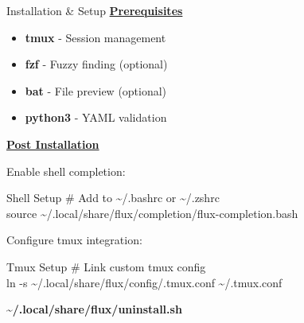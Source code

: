 \documentclass[10pt,a4paper]{article}
\begin{document}
\begin{multicols}{3}
\begin{textbox}{Installation \& Setup}
\underline{\textbf{Prerequisites}}
\begin{itemize}
    \item \textbf{tmux} - Session management
    \item \textbf{fzf} - Fuzzy finding (optional)
    \item \textbf{bat} - File preview (optional)  
    \item \textbf{python3} - YAML validation
\end{itemize}

\underline{\textbf{Post Installation}}

Enable shell completion:
\begin{simplecodebox}{Shell Setup}
\# Add to \textasciitilde/.bashrc or \textasciitilde/.zshrc\\
source \textasciitilde/.local/share/flux/completion/flux-completion.bash\\
\end{simplecodebox}

Configure tmux integration:
\begin{simplecodebox}{Tmux Setup}
\# Link custom tmux config\\
ln -s \textasciitilde/.local/share/flux/config/.tmux.conf \textasciitilde/.tmux.conf\\
\end{simplecodebox}


\textbf{\textasciitilde/.local/share/flux/uninstall.sh}

\end{textbox}

\end{multicols}
\end{document}
